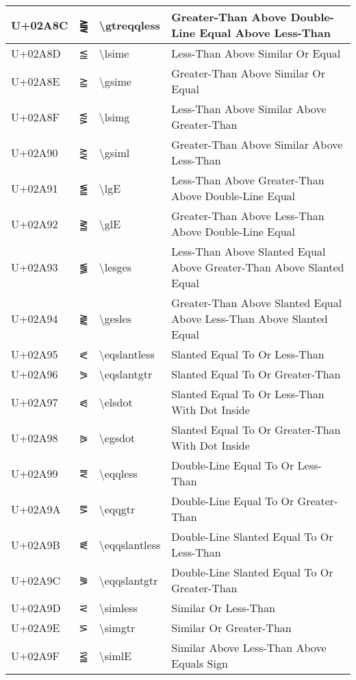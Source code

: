 \begin{table}[h]
\begin{tabulary}{\linewidth}{|L|L|L|L|}
\hline
U+02A8C & ⪌ & {\textbackslash}gtreqqless & Greater-Than Above Double-Line Equal Above Less-Than \\
\hline
U+02A8D & ⪍ & {\textbackslash}lsime & Less-Than Above Similar Or Equal \\
\hline
U+02A8E & ⪎ & {\textbackslash}gsime & Greater-Than Above Similar Or Equal \\
\hline
U+02A8F & ⪏ & {\textbackslash}lsimg & Less-Than Above Similar Above Greater-Than \\
\hline
U+02A90 & ⪐ & {\textbackslash}gsiml & Greater-Than Above Similar Above Less-Than \\
\hline
U+02A91 & ⪑ & {\textbackslash}lgE & Less-Than Above Greater-Than Above Double-Line Equal \\
\hline
U+02A92 & ⪒ & {\textbackslash}glE & Greater-Than Above Less-Than Above Double-Line Equal \\
\hline
U+02A93 & ⪓ & {\textbackslash}lesges & Less-Than Above Slanted Equal Above Greater-Than Above Slanted Equal \\
\hline
U+02A94 & ⪔ & {\textbackslash}gesles & Greater-Than Above Slanted Equal Above Less-Than Above Slanted Equal \\
\hline
U+02A95 & ⪕ & {\textbackslash}eqslantless & Slanted Equal To Or Less-Than \\
\hline
U+02A96 & ⪖ & {\textbackslash}eqslantgtr & Slanted Equal To Or Greater-Than \\
\hline
U+02A97 & ⪗ & {\textbackslash}elsdot & Slanted Equal To Or Less-Than With Dot Inside \\
\hline
U+02A98 & ⪘ & {\textbackslash}egsdot & Slanted Equal To Or Greater-Than With Dot Inside \\
\hline
U+02A99 & ⪙ & {\textbackslash}eqqless & Double-Line Equal To Or Less-Than \\
\hline
U+02A9A & ⪚ & {\textbackslash}eqqgtr & Double-Line Equal To Or Greater-Than \\
\hline
U+02A9B & ⪛ & {\textbackslash}eqqslantless & Double-Line Slanted Equal To Or Less-Than \\
\hline
U+02A9C & ⪜ & {\textbackslash}eqqslantgtr & Double-Line Slanted Equal To Or Greater-Than \\
\hline
U+02A9D & ⪝ & {\textbackslash}simless & Similar Or Less-Than \\
\hline
U+02A9E & ⪞ & {\textbackslash}simgtr & Similar Or Greater-Than \\
\hline
U+02A9F & ⪟ & {\textbackslash}simlE & Similar Above Less-Than Above Equals Sign \\

\end{tabulary}
\end{table}
